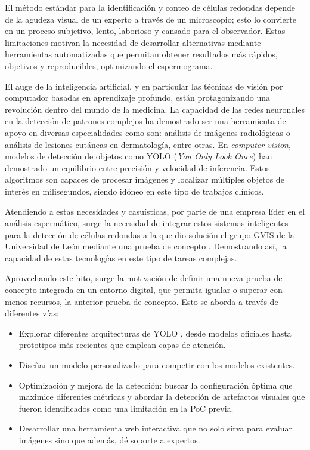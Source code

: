 \documentclass[12pt,a4paper,onecolumn,oneside]{report}
\begin{document}
El método estándar para la identificación y conteo de células redondas depende de la agudeza visual de un experto a través de un microscopio; esto lo convierte en
un proceso subjetivo, lento, laborioso y cansado para el observador. Estas limitaciones motivan la necesidad 
de desarrollar alternativas mediante herramientas automatizadas que permitan obtener resultados más rápidos, objetivos y reproducibles, optimizando el espermograma.

El auge de la inteligencia artificial, y en particular las técnicas de visión por computador basadas en aprendizaje profundo, están protagonizando una revolución dentro del mundo de la medicina.
La capacidad de las redes neuronales en la detección de patrones complejos ha demostrado ser una herramienta de apoyo en diversas especialidades como son: análisis de imágenes radiológicas o análisis de lesiones cutáneas en dermatología, entre otras.
En \textit{computer vision}, modelos de detección de objetos como YOLO (\textit{You Only Look Once}) \cite{ultralytics_models} han demostrado un equilibrio entre precisión y velocidad de inferencia. Estos algoritmos son capaces 
de procesar imágenes y localizar múltiples objetos de interés en milisegundos, siendo idóneo en este tipo de trabajos clínicos.

Atendiendo a estas necesidades y casuísticas, por parte de una empresa líder en el análisis espermático, surge la necesidad de integrar estos sistemas inteligentes para la detección de células redondas a la que dio solución el grupo GVIS de la 
Universidad de León mediante una prueba de concepto \cite{HamiltonThorneRoundCells}. Demostrando así, la capacidad de estas tecnologías en este tipo de tareas complejas.

Aprovechando este hito, surge la motivación de definir una nueva prueba de concepto integrada en un entorno digital, que permita igualar o superar con menos recursos, la anterior prueba de concepto. Esto se aborda a través de diferentes vías:

\begin{itemize}
  \item Explorar diferentes arquitecturas de YOLO \cite{ultralytics_models}, desde modelos oficiales hasta prototipos más recientes que emplean capas de atención. 
  \item Diseñar un modelo personalizado para competir con los modelos existentes.
  \item Optimización y mejora de la detección: buscar la configuración óptima que maximice diferentes métricas y abordar la detección de artefactos visuales que fueron identificados como una limitación en la PoC previa. 
  \item Desarrollar una herramienta web interactiva que no solo sirva para evaluar imágenes sino que además, dé soporte a expertos.
\end{itemize}
\end{document}
